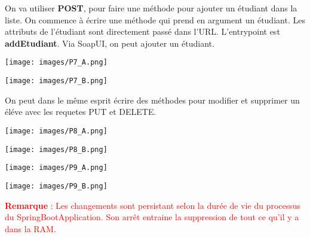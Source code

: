 \documentclass{rapport}
\begin{document}
On va utiliser \textbf{POST}, pour faire une méthode pour ajouter un étudiant dans la liste. On commence à écrire une méthode qui prend en argument un étudiant. Les attributs de l'étudiant sont directement passé dans l'URL. L'entrypoint est \textbf{addEtudiant}. Via SoapUI, on peut ajouter un étudiant.

\begin{minipage}{0.5\textwidth}
\texttt{[image: images/P7\_A.png]}
\label{fig:figure}
\end{minipage}
\hspace{1cm}
\begin{minipage}{0.5\textwidth}
\texttt{[image: images/P7\_B.png]}
\label{fig:figure}
\vspace{1cm}
\end{minipage}

On peut dans le même esprit écrire des méthodes pour modifier et supprimer un éléve avec les requetes PUT et DELETE.

\begin{minipage}{0.5\textwidth}
\texttt{[image: images/P8\_A.png]}
\label{fig:figure}
\end{minipage}
\hspace{1cm}
\begin{minipage}{0.5\textwidth}
\texttt{[image: images/P8\_B.png]}
\label{fig:figure}
\vspace{1cm}
\end{minipage}

\begin{minipage}{0.5\textwidth}
\texttt{[image: images/P9\_A.png]}
\label{fig:figure}
\end{minipage}
\hspace{1cm}
\begin{minipage}{0.5\textwidth}
\texttt{[image: images/P9\_B.png]}
\label{fig:figure}
\vspace{1cm}
\end{minipage}


\textcolor{red}{\textbf{Remarque} : Les changements sont persistant selon la durée de vie du processus du SpringBootApplication. Son arrêt entraine la suppression de tout ce qu'il y a dans la RAM}.
\end{document}
